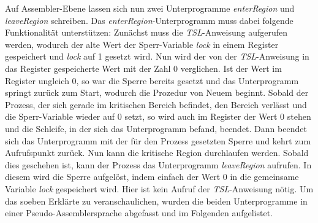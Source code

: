 \begin{description}
\begin{description}
								Auf Assembler-Ebene lassen sich nun zwei Unterprogramme \textit{enterRegion} und \textit{leaveRegion} schreiben. Das \textit{enterRegion}-Unterprogramm muss dabei folgende Funktionalität unterstützen: Zunächst muss die \textit{TSL}-Anweisung aufgerufen werden, wodurch der alte Wert der Sperr-Variable \textit{lock} in einem Register gespeichert und \textit{lock} auf 1 gesetzt wird. Nun wird der von der \textit{TSL}-Anweisung in das Register gespeicherte Wert mit der Zahl 0 verglichen. Ist der Wert im Register ungleich 0, so war die Sperre bereits gesetzt und das Unterprogramm springt zurück zum Start, wodurch die Prozedur von Neuem beginnt. Sobald der Prozess, der sich gerade im kritischen Bereich befindet, den Bereich verlässt und die Sperr-Variable wieder auf 0 setzt, so wird auch im Register der Wert 0 stehen und die Schleife, in der sich das Unterprogramm befand, beendet. Dann beendet sich das Unterprogramm mit der für den Prozess gesetzten Sperre und kehrt zum Aufrufspunkt zurück. Nun kann die kritische Region durchlaufen werden. Sobald dies geschehen ist, kann der Prozess das Unterprogramm \textit{leaveRegion} aufrufen. In diesem wird die Sperre aufgelöst, indem einfach der Wert 0 in die gemeinsame Variable \textit{lock} gespeichert wird. Hier ist kein Aufruf der \textit{TSL}-Anweisung nötig.
								Um das soeben Erklärte zu veranschaulichen, wurden die beiden Unterprogramme in einer Pseudo-Assemblersprache abgefasst und im Folgenden aufgelistet.
		
								
								

\end{description}
\end{description}

